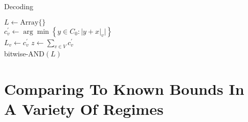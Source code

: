 \documentclass{article}
\begin{document}
\begin{multicols*}{2}
\begin{algorithm}[H]
  \caption{Decoding}
  \label{alg:three}
$ L \leftarrow \text{Array} \{ \} $\\
   {
  $c^{\prime}_{v} \leftarrow \arg\min {\left\{  y \in C_{0} : |y + x|_{v} |  \right\} } $\\
  $ L_{v} \leftarrow c^{\prime}_{v}$
 }
 $ z \leftarrow \sum_{v \in V}{c^{\prime}_{v}} $\\
 \Return  bitwise-AND$ (L) $
 
\end{algorithm}
  \section{Comparing To Known Bounds In A Variety Of Regimes}
  \printbibliography 
\end{multicols*}
\end{document}
